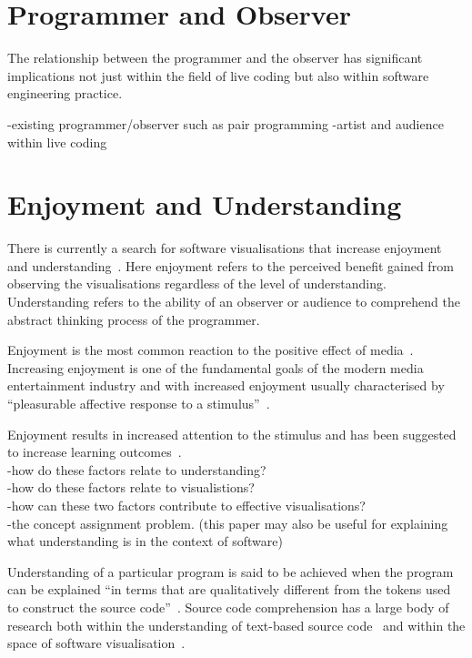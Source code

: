 \section{Programmer and Observer}

The relationship between the programmer and the observer has significant implications not just within the field of live coding but also within software engineering practice.

-existing programmer/observer such as pair programming
-artist and audience within live coding

\section{Enjoyment and Understanding}

There is currently a search for software visualisations that increase enjoyment and understanding~\cite{McLean2010a}. Here enjoyment refers to the perceived benefit gained from observing the visualisations regardless of the level of understanding. Understanding refers to the ability of an observer or audience to comprehend the abstract thinking process of the programmer.

Enjoyment is the most common reaction to the positive effect of media~\cite{Vorderer2004}. Increasing enjoyment is one of the fundamental goals of the modern media entertainment industry and with increased enjoyment usually characterised by ``pleasurable affective response to a stimulus''~\cite{Brock2004}. 

Enjoyment results in increased attention to the stimulus and has been suggested to increase learning outcomes~.\\
-how do these factors relate to understanding?\\
-how do these factors relate to visualistions?\\
-how can these two factors contribute to effective visualisations?\\
-the concept assignment problem. \cite{Biggerstaff1994} (this paper may also be useful for explaining what understanding is in the context of software)

Understanding of a particular program is said to be achieved when the program can be explained ``in terms that are qualitatively different from the tokens used to construct the source code''~\cite{Biggerstaff1994}. Source code comprehension has a large body of research both within the understanding of text-based source code~ and within the space of software visualisation~\cite{Hosking2005}.

